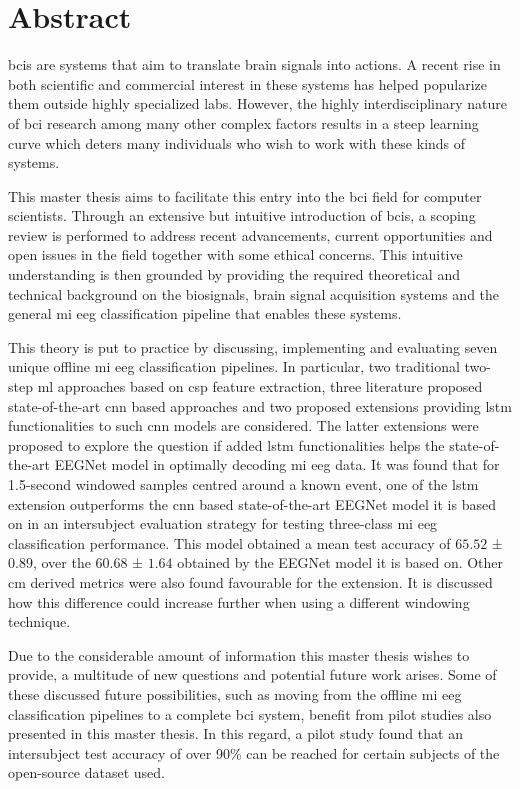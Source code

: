 \glsresetall

\chapter*{Abstract}
\label{ch:abstract}

\Glspl{bci} are systems that aim to translate brain signals into actions.
A recent rise in both scientific and commercial interest in these systems has helped popularize them outside highly specialized labs.
However, the highly interdisciplinary nature of \gls{bci} research among many other complex factors results in a steep learning curve which deters many individuals who wish to work with these kinds of systems.

This master thesis aims to facilitate this entry into the \gls{bci} field for computer scientists.
Through an extensive but intuitive introduction of \glspl{bci}, a scoping review is performed to address recent advancements, current opportunities and open issues in the field together with some ethical concerns.
This intuitive understanding is then grounded by providing the required theoretical and technical background on the \glspl{biosignal}, brain signal acquisition systems and the general \gls{mi} \gls{eeg} classification pipeline that enables these systems.

This theory is put to practice by discussing, implementing and evaluating seven unique offline \gls{mi} \gls{eeg} classification pipelines.
In particular, two traditional two-step \gls{ml} approaches based on \gls{csp} feature extraction, three literature proposed state-of-the-art \gls{cnn} based approaches and two proposed extensions providing \gls{lstm} functionalities to such \gls{cnn} models are considered.
The latter extensions were proposed to explore the question if added \gls{lstm} functionalities helps the state-of-the-art EEGNet model in optimally decoding \gls{mi} \gls{eeg} data.
It was found that for 1.5-second windowed samples centred around a known event, one of the \gls{lstm} extension outperforms the \gls{cnn} based state-of-the-art EEGNet model it is based on in an intersubject evaluation strategy for testing three-class \gls{mi} \gls{eeg} classification performance.
This model obtained a mean test accuracy of  $65.52$ ± $0.89$, over the $60.68$ ± $1.64$ obtained by the EEGNet model it is based on.
Other \gls{cm} derived metrics were also found favourable for the extension.
It is discussed how this difference could increase further when using a different windowing technique.

Due to the considerable amount of information this master thesis wishes to provide, a multitude of new questions and potential future work arises.
Some of these discussed future possibilities, such as moving from the offline \gls{mi} \gls{eeg} classification pipelines to a complete \gls{bci} system, benefit from pilot studies also presented in this master thesis.
In this regard, a pilot study found that an intersubject test accuracy of over 90\% can be reached for certain subjects of the open-source dataset used.